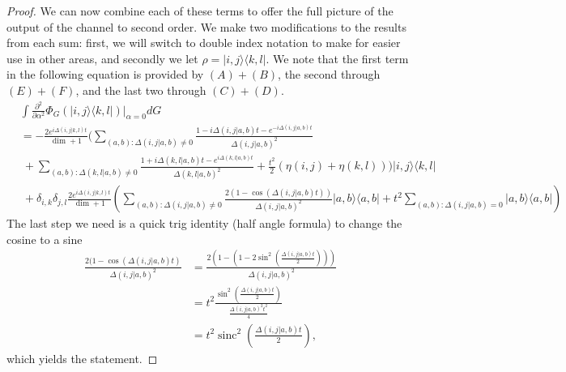\documentclass{article}
\newcommand{\ketbra}[2]{| #1\rangle\! \langle #2|}
\newcommand{\parens}[1]{\left( #1 \right)}
\DeclareMathOperator{\sinc}{sinc}
\begin{document}
\begin{proof}
 We can now combine each of these terms to offer the full picture of the output of the channel to second order. We make two modifications to the results from each sum: first, we will switch to double index notation to make for easier use in other areas, and secondly we let $\rho = \ketbra{i,j}{k,l}$. We note that the first term in the following equation is provided by $(A) + (B)$, the second through $(E) + (F)$, and the last two through $(C) + (D)$. 
 \begin{align}
     &\int \frac{\partial^2}{\partial \alpha^2} \Phi_G(\ketbra{i,j}{k,l})\bigg|_{\alpha = 0} dG \\
     &= -\frac{2  e^{i \Delta(i,j|k,l) t}}{\dim + 1} \bigg(\sum_{(a,b): \Delta(i,j|a,b) \neq 0} \frac{1 - i \Delta(i,j|a,b)t - e^{-i \Delta(i,j|a,b) t}}{\Delta(i,j|a,b)^2} \nonumber \\
     &~+ \sum_{(a,b): \Delta(k,l|a,b) \neq 0} \frac{1 + i \Delta(k,l|a,b) t - e^{i \Delta(k,l|a,b) t}}{\Delta(k,l|a,b)^2} + \frac{t^2}{2}(\eta(i,j) + \eta(k,l)) \bigg) \ketbra{i,j}{k,l} \nonumber \\
    &~ +\delta_{i,k} \delta_{j,l} \frac{2 e^{i \Delta(i,j|k,l)t}}{\dim+1} \parens{ \sum_{(a,b): \Delta(i,j|a,b) \neq 0 } \frac{2(1- \cos (\Delta(i,j|a,b)t))}{\Delta(i,j|a,b)^2} \ketbra{a,b}{a,b} + t^2 \sum_{(a,b) : \Delta(i,j|a,b) = 0} \ketbra{a,b}{a,b}} \label{eq:second_order_output}
 \end{align}
The last step we need is a quick trig identity (half angle formula) to change the cosine to a sine
\begin{align}
    \frac{2(1 - \cos(\Delta(i,j| a,b)t)}{\Delta(i,j|a,b)^2} &= \frac{2\left( 1 - \left(1 - 2 \sin^2\left(\frac{\Delta(i,j|a,b)t}{2} \right) \right) \right)}{\Delta(i,j|a,b)^2} \\
    &= t^2 \frac{\sin^2 \left(\frac{\Delta(i,j|a,b) t}{2} \right)}{\frac{\Delta(i,j|a,b)^2 t^2}{4}} \\
    &= t^2 \sinc^2 \left(\frac{\Delta(i,j|a,b) t}{2 } \right),
\end{align}
which yields the statement.
\end{proof}
\end{document}
